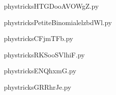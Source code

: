    \newcommand{\CaptionFigHTGDooAVOWgZ}{<+Type your caption here+>}
    \begin{center}
        
    \end{center}
    phystricksHTGDooAVOWgZ.py

    

    \clearpage
    


    \newcommand{\CaptionFigPetiteBinomialelzbdWl}{<+Type your caption here+>}
    \begin{center}
        
    \end{center}
    phystricksPetiteBinomialelzbdWl.py

    

    \clearpage
    


    \newcommand{\CaptionFigCFjmTFb}{<+Type your caption here+>}
    \begin{center}
        
    \end{center}
    phystricksCFjmTFb.py

    

    \clearpage
    


    \newcommand{\CaptionFigRKSooSVlhiF}{<+Type your caption here+>}
    \begin{center}
        
    \end{center}
    phystricksRKSooSVlhiF.py

    

    \clearpage
    


    \newcommand{\CaptionFigENQhxmG}{<+Type your caption here+>}
    \begin{center}
        
    \end{center}
    phystricksENQhxmG.py

    

    \clearpage
    


    \newcommand{\CaptionFigGRRhrJe}{<+Type your caption here+>}
    \begin{center}
        
    \end{center}
    phystricksGRRhrJe.py


